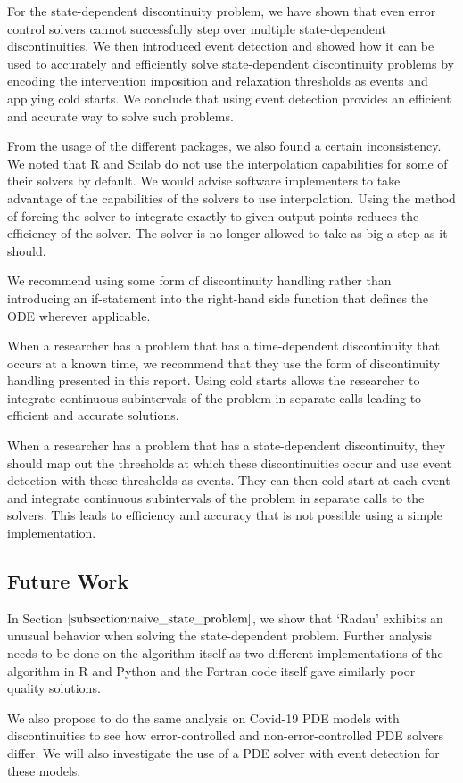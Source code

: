 For the state-dependent discontinuity problem, we have shown that even error control solvers cannot successfully step over multiple state-dependent discontinuities. We then introduced event detection and showed how it can be used to accurately and efficiently solve state-dependent discontinuity problems by encoding the intervention imposition and relaxation thresholds as events and applying cold starts. We conclude that using event detection provides an efficient and accurate way to solve such problems.

From the usage of the different packages, we also found a certain inconsistency. We noted that R and Scilab do not use the interpolation capabilities for some of their solvers by default. We would advise software implementers to take advantage of the capabilities of the solvers to use interpolation. Using the method of forcing the solver to integrate exactly to given output points reduces the efficiency of the solver. The solver is no longer allowed to take as big a step as it should.

We recommend using some form of discontinuity handling rather than introducing an if-statement into the right-hand side function that defines the ODE wherever applicable.

When a researcher has a problem that has a time-dependent discontinuity that occurs at a known time, we recommend that they use the form of discontinuity handling presented in this report. Using cold starts allows the researcher to integrate continuous subintervals of the problem in separate calls leading to efficient and accurate solutions.

When a researcher has a problem that has a state-dependent discontinuity, they should map out the thresholds at which these discontinuities occur and use event detection with these thresholds as events. They can then cold start at each event and integrate continuous subintervals of the problem in separate calls to the solvers. This leads to efficiency and accuracy that is not possible using a simple implementation. 

\subsection{Future Work}
\label{subsection:future_work}
In Section $\ref{subsection:naive_state_problem}$, we show that `Radau' exhibits an unusual behavior when solving the state-dependent problem. Further analysis needs to be done on the algorithm itself as two different implementations of the algorithm in R and Python and the Fortran code itself gave similarly poor quality solutions.

We also propose to do the same analysis on Covid-19 PDE models with discontinuities to see how error-controlled and non-error-controlled PDE solvers differ. We will also investigate the use of a PDE solver with event detection for these models.


